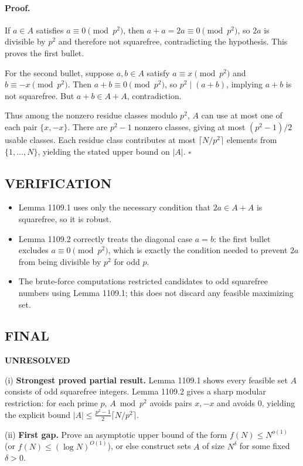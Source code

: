 \paragraph{Proof.}
If $a\in A$ satisfies $a\equiv 0\pmod{p^2}$, then $a+a=2a\equiv 0\pmod{p^2}$, so $2a$ is divisible by $p^2$ and therefore not squarefree, contradicting the hypothesis. This proves the first bullet.

For the second bullet, suppose $a,b\in A$ satisfy $a\equiv x\pmod{p^2}$ and $b\equiv -x\pmod{p^2}$. Then $a+b\equiv 0\pmod{p^2}$, so $p^2\mid (a+b)$, implying $a+b$ is not squarefree. But $a+b\in A+A$, contradiction.

Thus among the nonzero residue classes modulo $p^2$, $A$ can use at most one of each pair $\{x,-x\}$.
There are $p^2-1$ nonzero classes, giving at most $(p^2-1)/2$ usable classes.
Each residue class contributes at most $\lceil N/p^2\rceil$ elements from $\{1,\dots,N\}$, yielding the stated upper bound on $|A|$. \hfill $\square$

\subsection*{VERIFICATION}
\begin{itemize}
\item Lemma 1109.1 uses only the necessary condition that $2a\in A+A$ is squarefree, so it is robust.
\item Lemma 1109.2 correctly treats the diagonal case $a=b$: the first bullet excludes $a\equiv 0\pmod{p^2}$, which is exactly the condition needed to prevent $2a$ from being divisible by $p^2$ for odd $p$.
\item The brute-force computations restricted candidates to odd squarefree numbers using Lemma 1109.1; this does not discard any feasible maximizing set.
\end{itemize}

\subsection*{FINAL}
\textbf{UNRESOLVED}

(i) \textbf{Strongest proved partial result.}
Lemma 1109.1 shows every feasible set $A$ consists of odd squarefree integers.
Lemma 1109.2 gives a sharp modular restriction: for each prime $p$, $A\bmod p^2$ avoids pairs $x,-x$ and avoids $0$, yielding the explicit bound
$|A|\le \frac{p^2-1}{2}\lceil N/p^2\rceil$.

(ii) \textbf{First gap.}
Prove an asymptotic upper bound of the form $f(N)\le N^{o(1)}$ (or $f(N)\le (\log N)^{O(1)}$), or else construct sets $A$ of size $N^{\delta}$ for some fixed $\delta>0$.

